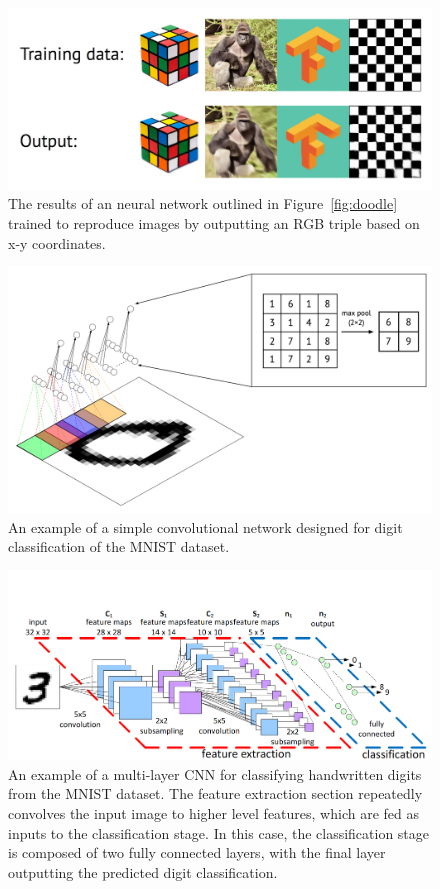\documentclass[12pt,oneside,onecolumn,a4paper]{article}
\begin{document}
\begin{figure}[H]
\begin{center}
\includegraphics[width=0.8\columnwidth]{figures/doodle_images}
\caption{The results of an neural network outlined in Figure~\ref{fig:doodle} trained to reproduce images by outputting an RGB triple based on x-y coordinates.
\label{fig:doodle_results}
}
\end{center}
\end{figure}
\begin{figure}[H]
\begin{center}
\includegraphics[width=0.8\columnwidth]{figures/convnet}
\caption{An example of a simple convolutional network designed for digit classification of the MNIST dataset. }%
\end{center}
\end{figure}

\begin{figure}[H]
\begin{center}
\includegraphics[width=0.8\columnwidth]{figures/CNN/CNN}
\caption{An example of a multi-layer CNN for classifying handwritten digits from the MNIST dataset. The feature extraction section repeatedly convolves the input image to higher level features, which are fed as inputs to the classification stage. In this case, the classification stage is composed of two fully connected layers, with the final layer outputting the predicted digit classification. \citep{peemen_mesman_corporaal_2011}%
}
\end{center}
\end{figure}
\end{document}
